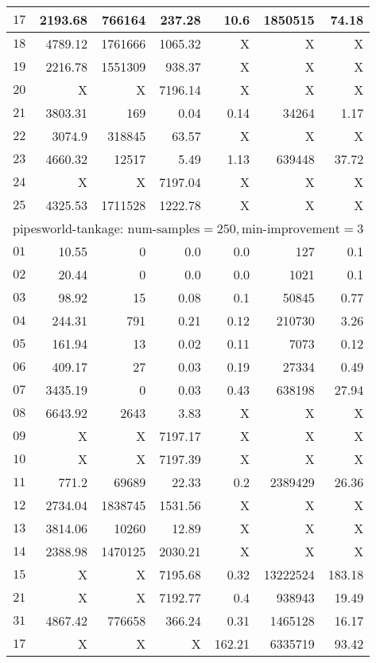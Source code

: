 \begin{longtable}{|c||r|r|r||r|r|r|}
$17$ & 2193.68 & 766164 & 237.28 & 10.6 & 1850515 & 74.18 \\\hline
$18$ & 4789.12 & 1761666 & 1065.32 & X & X & X \\\hline
$19$ & 2216.78 & 1551309 & 938.37 & X & X & X \\\hline
$20$ & X & X & 7196.14 & X & X & X \\\hline
$21$ & 3803.31 & 169 & 0.04 & 0.14 & 34264 & 1.17 \\\hline
$22$ & 3074.9 & 318845 & 63.57 & X & X & X \\\hline
$23$ & 4660.32 & 12517 & 5.49 & 1.13 & 639448 & 37.72 \\\hline
$24$ & X & X & 7197.04 & X & X & X \\\hline
$25$ & 4325.53 & 1711528 & 1222.78 & X & X & X \\\hline

\multicolumn{7}{|l|}{pipesworld-tankage: $\text{num-samples}=250,\text{min-improvement}=3$}\\\hline
$01$ & 10.55 & 0 & 0.0 & 0.0 & 127 & 0.1 \\\hline
$02$ & 20.44 & 0 & 0.0 & 0.0 & 1021 & 0.1 \\\hline
$03$ & 98.92 & 15 & 0.08 & 0.1 & 50845 & 0.77 \\\hline
$04$ & 244.31 & 791 & 0.21 & 0.12 & 210730 & 3.26 \\\hline
$05$ & 161.94 & 13 & 0.02 & 0.11 & 7073 & 0.12 \\\hline
$06$ & 409.17 & 27 & 0.03 & 0.19 & 27334 & 0.49 \\\hline
$07$ & 3435.19 & 0 & 0.03 & 0.43 & 638198 & 27.94 \\\hline
$08$ & 6643.92 & 2643 & 3.83 & X & X & X \\\hline
$09$ & X & X & 7197.17 & X & X & X \\\hline
$10$ & X & X & 7197.39 & X & X & X \\\hline
$11$ & 771.2 & 69689 & 22.33 & 0.2 & 2389429 & 26.36 \\\hline
$12$ & 2734.04 & 1838745 & 1531.56 & X & X & X \\\hline
$13$ & 3814.06 & 10260 & 12.89 & X & X & X \\\hline
$14$ & 2388.98 & 1470125 & 2030.21 & X & X & X \\\hline
$15$ & X & X & 7195.68 & 0.32 & 13222524 & 183.18 \\\hline
$21$ & X & X & 7192.77 & 0.4 & 938943 & 19.49 \\\hline
$31$ & 4867.42 & 776658 & 366.24 & 0.31 & 1465128 & 16.17 \\\hline
$17$ &  X &  X &  X & 162.21 & 6335719 & 93.42 \\\hline


\end{longtable}
